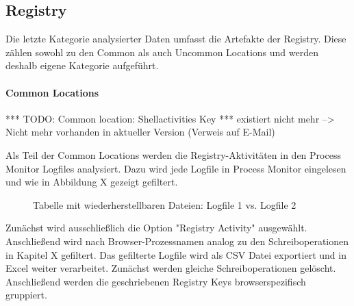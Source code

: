 \subsection{Registry}

Die letzte Kategorie analysierter Daten umfasst die Artefakte der Registry.
Diese zählen sowohl zu den Common als auch Uncommon Locations und werden deshalb eigene Kategorie aufgeführt.

\paragraph*{Common Locations}

*** TODO: Common location: Shellactivities Key ***
	existiert nicht mehr --> Nicht mehr vorhanden in aktueller Version (Verweis auf E-Mail)

Als Teil der Common Locations werden die Registry-Aktivitäten in den Process Monitor Logfiles analysiert.
Dazu wird jede Logfile in Process Monitor eingelesen und wie in Abbildung X gezeigt gefiltert.
\begin{figure}[h!]
	\caption{Tabelle mit wiederherstellbaren Dateien: Logfile 1 vs. Logfile 2}
\end{figure}
Zunächst wird ausschließlich die Option "Registry Activity" ausgewählt.
Anschließend wird nach Browser-Prozessnamen analog zu den Schreiboperationen in Kapitel X gefiltert.
Das gefilterte Logfile wird als CSV Datei exportiert und in Excel weiter verarbeitet.
Zunächst werden gleiche Schreiboperationen gelöscht.
Anschließend werden die geschriebenen Registry Keys browserspezifisch gruppiert.
	
